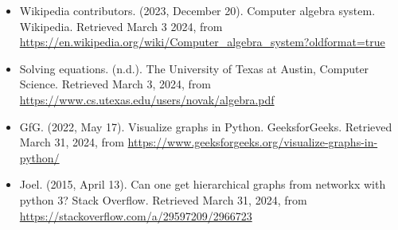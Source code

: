 \documentclass[11pt]{article}
\begin{document}
\begin{itemize}
\item Wikipedia contributors. (2023, December 20). Computer algebra system. Wikipedia. Retrieved March 3 2024, from \href{https://en.wikipedia.org/wiki/Computer_algebra_system?oldformat=true}{https://en.wikipedia.org/wiki/Computer_algebra_system?oldformat=true}
\item Solving equations. (n.d.). The University of Texas at Austin, Computer Science. Retrieved March 3, 2024, from \href{https://www.cs.utexas.edu/users/novak/algebra.pdf}{https://www.cs.utexas.edu/users/novak/algebra.pdf}
\item GfG. (2022, May 17). Visualize graphs in Python. GeeksforGeeks. Retrieved March 31, 2024, from \href{https://www.geeksforgeeks.org/visualize-graphs-in-python/}{https://www.geeksforgeeks.org/visualize-graphs-in-python/}
\item Joel. (2015, April 13). Can one get hierarchical graphs from networkx with python 3? Stack Overflow. Retrieved March 31, 2024, from \href{https://stackoverflow.com/a/29597209/2966723}{https://stackoverflow.com/a/29597209/2966723}
\end{itemize}
\end{document}
